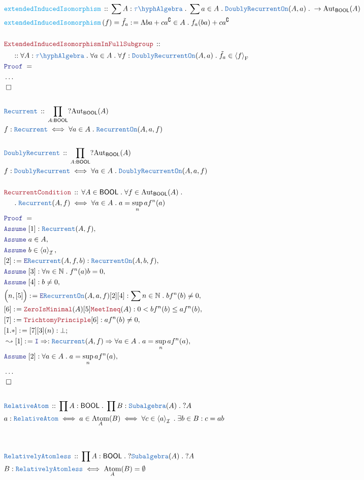 \documentclass[12pt]{scrartcl}
\newcommand{\TYPE}[1]{\textcolor{NavyBlue}{\mathtt{#1}}}
\newcommand{\FUNC}[1]{\textcolor{Cerulean}{\mathtt{#1}}}
\newcommand{\LOGIC}[1]{\textcolor{Blue}{\mathtt{#1}}}
\newcommand{\THM}[1]{\textcolor{Maroon}{\mathtt{#1}}}
\renewcommand{\.}{\; . \;}
\newcommand{\de}{: \kern 0.1pc =}
\newcommand{\Act}[1]{\left( #1 \right)}
\newcommand{\Theorem}[2]{& \THM{#1} \, :: \, #2 \\ & \Proof = \\ }
\newcommand{\DeclareType}[2]{& \TYPE{#1} \, :: \, #2 \\}
\newcommand{\DefineType}[3]{& #1 : \TYPE{#2} \iff #3 \\}
\newcommand{\DefineNamedType}[4]{& #1 : \TYPE{#2} \iff #3 \iff #4 \\}
\newcommand{\DeclareFunc}[2]{& \FUNC{#1} \, :: \, #2 \\}
\newcommand{\DefineNamedFunc}[4]{&  \FUNC{#1}\Act{#2} = #3 \de #4 \\}
\newcommand{\NewLine}{\\ & \kern 1pc}
\newcommand{\Page}[1]{ \begin{align*} #1 \end{align*}   }
\newcommand{\NoProof}{ & \ldots \\ \EndProof}
\newcommand{\Imply}{\Rightarrow}
\newcommand{\Intro}{\LOGIC{I}}
\newcommand{\Elim}{\LOGIC{E}}
\newcommand{\Nat}{\mathbb{N} }
\newcommand{\Aut}{\mathrm{Aut}}
\renewcommand{\c}{\complement}
\newcommand{\Say}[3]{& #1 \de #2 : #3, \\}
\newcommand{\Conclude}[3]{& #1 \de #2 : #3; \\}
\newcommand{\Derive}[3]{& \leadsto #1 \de #2 : #3, \\}
\newcommand{\Assume}[2]{& \LOGIC{Assume} \; #1 : #2, \\}
\newcommand{\AssumeIn}[2]{& \LOGIC{Assume} \; #1 \in #2, \\}
\newcommand{\QED}{\; \square}
\newcommand{\EndProof}{& \QED \\}
\newcommand{\Proof}{\LOGIC{Proof} \; }
\newcommand{\genIdeal}[1]{\left\langle #1 \right\rangle_\mathcal{I}}
\newcommand{\TAlgebra}{\TYPE{\tau\hyph Algebra}}
\DeclareMathOperator{\Atom}{Atom}
\newcommand{\genFS}[1]{\left\langle #1 \right\rangle_\mathrm{F}}
\newcommand{\BOOL}{\mathsf{BOOL}}
\begin{document}
\Page{
	\DeclareFunc{extendedInducedIsomorphism}
	{
		\sum A : \TAlgebra \.
		\sum a \in A \.
		\TYPE{DoublyRecurrentOn}(A,a)\.
		\to
		\Aut_\BOOL(A)
	}
	\DefineNamedFunc{extendedInducedIsomorphism}{f}{\tilde{f_a}}
	{
		\Lambda ba + ca^\c \in A \.  f_a(ba)  + ca^\c
	}
	\\
	\Theorem{ExtendedInducedIsomorphismInFullSubgroup}
	{
		\NewLine :: 		
		\forall A : \TAlgebra \.
		\forall a \in A \. 
		\forall f : \TYPE{DoublyRecurrentOn}(A,a) \. 
		\tilde{f_a} \in \genFS{f}
	}
	\NoProof
	\\
	\DeclareType{Recurrent}{\prod_{A : \BOOL} ?\Aut_\BOOL(A)}
	\DefineType{f}{Recurrent}{\forall a \in A \. \TYPE{RecurrentOn}(A,a,f)}
	\\
	\DeclareType{DoublyRecurrent}{\prod_{A : \BOOL} ?\Aut_\BOOL(A)}
	\DefineType{f}{DoublyRecurrent}{\forall a \in A \. \TYPE{DoublyRecurrentOn}(A,a,f)}
	\\
	\Theorem{RecurrentCondition}
	{
		\forall A \in \BOOL \.
		\forall f \in \Aut_\BOOL(A) \. \NewLine \.
		\TYPE{Recurrent}(A,f) \iff
		\forall 
		a \in A  \. a = \sup_n af^{n}(a)
	}
	\Assume{[1]}{\TYPE{Recurrent}(A,f)}
	\AssumeIn{a}{A}
	\AssumeIn{b}{\genIdeal{a}}
	\Say{[2]}{\Elim \TYPE{Recurrent}(A,f,b)}{\TYPE{RecurrentOn}(A,b,f)}
	\Assume{[3]}{\forall n \in \Nat \. f^{n}(a) b  = 0}
	\Assume{[4]}{b \neq 0}	
	\Say{\Big( n, [5] \Big)}{\Elim \TYPE{RecurrentOn}(A,a,f)[2][4]}
	{
		\sum n \in \Nat \. bf^{n}(b) \neq  0 	
	}
	\Say{[6]}{\THM{ZeroIsMinimal}(A)[5]\THM{MeetIneq}(A)}{  0 < bf^{n}(b) \le  af^{n}(b)   }
	\Say{[7]}{\THM{TrichtomyPrinciple}[6]}{af^{n}(b) \neq 0}
	\Conclude{[1.*]}{[7][3](n)}{\bot}
	\Derive{[1]}{\Intro \Imply}
	{
		\TYPE{Recurrent}(A,f) \Imply
		\forall 
		a \in A  \. a = \sup_n af^{n}(a)
	}
	\Assume{[2]}
	{
		\forall 
		a \in A  \. a = \sup_n af^{n}(a)
	}
	\NoProof
	\\
	\DeclareType{RelativeAtom}{\prod A : \BOOL \. \prod B : \TYPE{Subalgebra}(A) \. ?A}
	\DefineNamedType{a}{RelativeAtom}{a \in \Atom_A(B)}
	{
		\forall c \in \genIdeal{a} \. \exists b  \in B : c = ab
	}
	\\
	\\
	\DeclareType{RelativelyAtomless}
	{\prod A : \BOOL \.?\TYPE{Subalgebra}(A) \. ?A}
	\DefineType{B}{RelativelyAtomless}
	{
		\Atom_A(B) = \emptyset
	}
}
\end{document}
